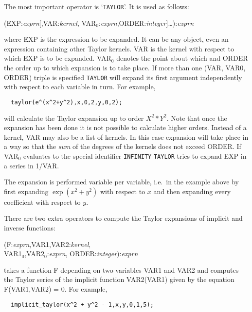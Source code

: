The most important operator is `\verb+TAYLOR+'. 
It is used as follows:

(EXP:{\em exprn}[,VAR:{\em kernel},
            VAR$_0$:{\em exprn},ORDER:{\em integer}]\ldots):{\em exprn}

where EXP is the expression to be expanded. It can be any \REDUCE{}
object, even an expression containing other Taylor kernels.  VAR is
the kernel with respect to which EXP is to be expanded. VAR$_0$
denotes the point about which and ORDER the order up to which
expansion is to take place. If more than one (VAR, VAR0, ORDER) triple
is specified {\tt TAYLOR} will expand its first argument independently
with respect to each variable in turn. For example,

\begin{verbatim}
  taylor(e^(x^2+y^2),x,0,2,y,0,2);
\end{verbatim}

will calculate the Taylor expansion up to order $X^{2}*Y^{2}$.
Note that once the expansion has been done it is not possible to
calculate higher orders.
Instead of a kernel, VAR may also
be a list of kernels. In this case expansion will take place in a way
so that the {\em sum\/} of the degrees of the kernels does not exceed
ORDER.
If VAR$_0$ evaluates to the special identifier \verb|INFINITY|
{\tt TAYLOR} tries to expand EXP in a series in 1/VAR.

The expansion is performed variable per variable, i.e.\ in the example
above by first expanding $\exp(x^{2}+y^{2})$ with respect to $x$ and
then expanding every coefficient with respect to $y$.

 There are two
extra operators to compute the Taylor expansions of implicit and
inverse functions:

(F:{\em exprn},VAR1,VAR2:{\em kernel},\\
VAR1$_0$,VAR2$_0$:{\em exprn},
                                 ORDER:{\em integer}):{\em exprn}

takes a function F depending on two variables VAR1 and VAR2 and
computes the Taylor series of the implicit function VAR2(VAR1)
given by the equation F(VAR1,VAR2) = 0. For example,

\begin{verbatim}
  implicit_taylor(x^2 + y^2 - 1,x,y,0,1,5);
\end{verbatim}

